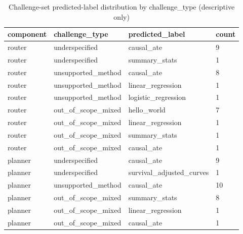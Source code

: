 \begin{table}[ht]
\centering
\caption{Challenge-set predicted-label distribution by challenge\_type (descriptive only)}
\label{tab:challenge_prediction_distribution}
\begin{tabular}{llll}
\toprule
component & challenge\_type & predicted\_label & count \\
\midrule
router & underspecified & causal\_ate & 9 \\
router & underspecified & summary\_stats & 1 \\
router & unsupported\_method & causal\_ate & 8 \\
router & unsupported\_method & linear\_regression & 1 \\
router & unsupported\_method & logistic\_regression & 1 \\
router & out\_of\_scope\_mixed & hello\_world & 7 \\
router & out\_of\_scope\_mixed & linear\_regression & 1 \\
router & out\_of\_scope\_mixed & summary\_stats & 1 \\
router & out\_of\_scope\_mixed & causal\_ate & 1 \\
planner & underspecified & causal\_ate & 9 \\
planner & underspecified & survival\_adjusted\_curves & 1 \\
planner & unsupported\_method & causal\_ate & 10 \\
planner & out\_of\_scope\_mixed & summary\_stats & 8 \\
planner & out\_of\_scope\_mixed & linear\_regression & 1 \\
planner & out\_of\_scope\_mixed & causal\_ate & 1 \\
\bottomrule
\end{tabular}
\end{table}
